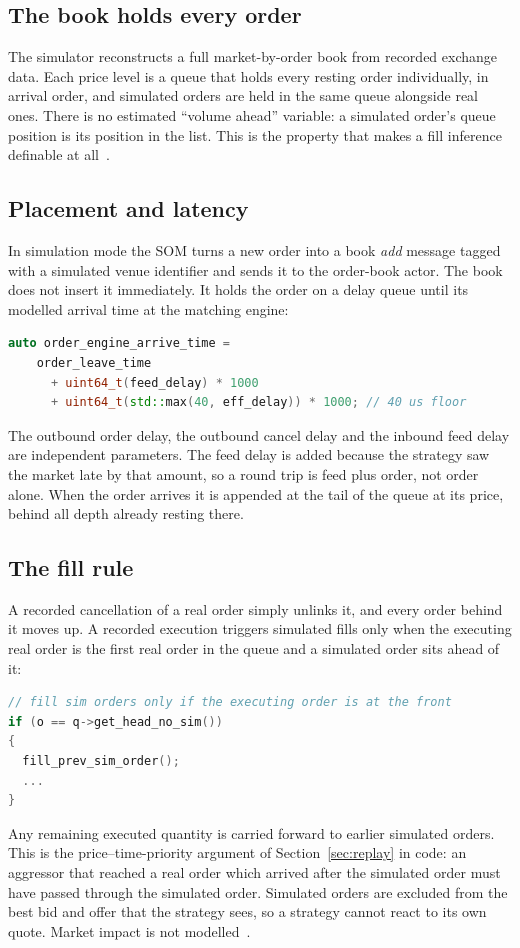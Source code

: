 \subsection{The book holds every order}

The simulator reconstructs a full market-by-order book from recorded exchange data. Each price
level is a queue that holds every resting order individually, in arrival order, and simulated
orders are held in the same queue alongside real ones. There is no estimated ``volume ahead''
variable: a simulated order's queue position is its position in the list. This is the property
that makes a fill inference definable at all~\citep{maciejewski_shadow}.

\subsection{Placement and latency}

In simulation mode the SOM turns a new order into a book \emph{add} message tagged with a
simulated venue identifier and sends it to the order-book actor. The book does not insert it
immediately. It holds the order on a delay queue until its modelled arrival time at the matching
engine:
\begin{lstlisting}[language=C++]
auto order_engine_arrive_time =
    order_leave_time
      + uint64_t(feed_delay) * 1000
      + uint64_t(std::max(40, eff_delay)) * 1000; // 40 us floor
\end{lstlisting}
The outbound order delay, the outbound cancel delay and the inbound feed delay are independent
parameters. The feed delay is added because the strategy saw the market late by that amount, so a
round trip is feed plus order, not order alone. When the order arrives it is appended at the tail
of the queue at its price, behind all depth already resting there.

\subsection{The fill rule}

A recorded cancellation of a real order simply unlinks it, and every order behind it moves up. A
recorded execution triggers simulated fills only when the executing real order is the first real
order in the queue and a simulated order sits ahead of it:
\begin{lstlisting}[language=C++]
// fill sim orders only if the executing order is at the front
if (o == q->get_head_no_sim())
{
  fill_prev_sim_order();
  ...
}
\end{lstlisting}
Any remaining executed quantity is carried forward to earlier simulated orders. This is the
price--time-priority argument of Section~\ref{sec:replay} in code: an aggressor that reached a
real order which arrived after the simulated order must have passed through the simulated order.
Simulated orders are excluded from the best bid and offer that the strategy sees, so a strategy
cannot react to its own quote. Market impact is not modelled~\citep{maciejewski_shadow}.

